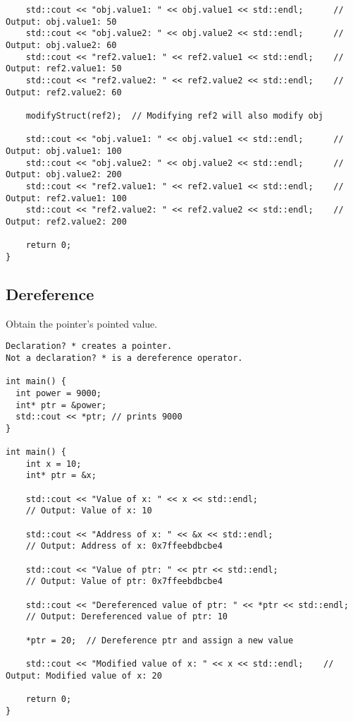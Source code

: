 \documentclass[openany]{report}
\begin{document}
\begin{verbatim}
    std::cout << "obj.value1: " << obj.value1 << std::endl;      // Output: obj.value1: 50
    std::cout << "obj.value2: " << obj.value2 << std::endl;      // Output: obj.value2: 60
    std::cout << "ref2.value1: " << ref2.value1 << std::endl;    // Output: ref2.value1: 50
    std::cout << "ref2.value2: " << ref2.value2 << std::endl;    // Output: ref2.value2: 60

    modifyStruct(ref2);  // Modifying ref2 will also modify obj

    std::cout << "obj.value1: " << obj.value1 << std::endl;      // Output: obj.value1: 100
    std::cout << "obj.value2: " << obj.value2 << std::endl;      // Output: obj.value2: 200
    std::cout << "ref2.value1: " << ref2.value1 << std::endl;    // Output: ref2.value1: 100
    std::cout << "ref2.value2: " << ref2.value2 << std::endl;    // Output: ref2.value2: 200

    return 0;
}

\end{verbatim}
\subsection{Dereference}

Obtain the pointer's pointed value. 

\begin{verbatim}
Declaration? * creates a pointer.
Not a declaration? * is a dereference operator.

int main() {
  int power = 9000;
  int* ptr = &power;
  std::cout << *ptr; // prints 9000
}

int main() {
    int x = 10;
    int* ptr = &x;

    std::cout << "Value of x: " << x << std::endl;            
    // Output: Value of x: 10

    std::cout << "Address of x: " << &x << std::endl;         
    // Output: Address of x: 0x7ffeebdbcbe4

    std::cout << "Value of ptr: " << ptr << std::endl;        
    // Output: Value of ptr: 0x7ffeebdbcbe4

    std::cout << "Dereferenced value of ptr: " << *ptr << std::endl;  
    // Output: Dereferenced value of ptr: 10

    *ptr = 20;  // Dereference ptr and assign a new value

    std::cout << "Modified value of x: " << x << std::endl;    // Output: Modified value of x: 20

    return 0;
}
\end{verbatim}
\end{document}
